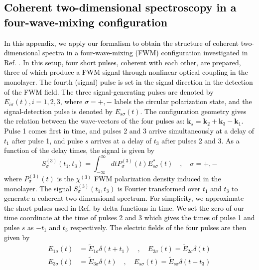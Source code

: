 \documentclass[aps,prb,superscriptaddress,letterpaper,amsmath,amssymb,twocolumn,preprintnumbers]{revtex4}
\newcommand\revisionA[1]{\textcolor{black}{#1}}
\begin{document}
\revisionA{ %
\section{Coherent two-dimensional spectroscopy in a four-wave-mixing configuration}
\label{Sec:appendix-FWM}
%
In this appendix, we apply our formalism to obtain the structure of coherent two-dimensional spectra in a four-wave-mixing (FWM) configuration investigated in Ref. \onlinecite{hao-etal.17}. In this setup, four short pulses, coherent with each other, are prepared, three of which produce a FWM signal through nonlinear optical coupling in the monolayer. The fourth (signal) pulse is set in the signal direction in the detection of the FWM field. The three signal-generating pulses are denoted by $E_{i \sigma} (t) , i = 1, 2, 3$, where $\sigma = +,-$ labels the circular polarization state, and the signal-detection pulse is denoted by $E_{s \sigma} (t)$. The configuration geometry gives the relation between the wave-vectors of the four pulses as: $\mathbf{k}_s = \mathbf{k}_2 + \mathbf{k}_3 -  \mathbf{k}_1$. Pulse 1 comes first in time, and pulses 2 and 3 arrive simultaneously at a delay of $t_1$ after pulse 1, and pulse $s$ arrives at a delay of $t_3$ after pulses 2 and 3. As a function of the delay times, the signal is given by \cite{hao-etal.17}
\begin{equation}\label{FWM-signal.equ}
S_{\sigma}^{(3)} (t_1, t_3) = \int^{\infty}_{- \infty} d t P^{(3)}_{\sigma} (t) E^{\ast}_{s \sigma} (t) \quad , \quad \sigma = +,-
\end{equation}
where $P^{(3)}_{\sigma} (t)$ is the $\chi^{(3)}$ FWM polarization density induced in the monolayer. The signal $S_{\sigma}^{(3)} (t_1, t_3)$ is Fourier transformed over $t_1$ and $t_3$ to generate a coherent two-dimensional spectrum.
%
%
For simplicity, we approximate the short pulses used in Ref. \onlinecite{hao-etal.17} by delta functions in time. We set the zero of our time coordinate at the time of pulses 2 and 3 which gives the times of pulse 1 and pulse $s$ as $- t_1$ and $t_3$ respectively. The electric fields of the four pulses are then given by
\begin{align}
E_{1 \sigma} (t) &= \tilde{E}_{1 \sigma} \delta (t+t_1) \quad , \quad E_{2 \sigma} (t) = \tilde{E}_{2 \sigma} \delta (t) \nonumber \\
\label{FWM-E.equ}
E_{3 \sigma} (t) &= \tilde{E}_{3 \sigma} \delta (t) \quad , \quad E_{s \sigma} (t) = \tilde{E}_{s \sigma} \delta (t-t_3)
\end{align}
}
\end{document}
